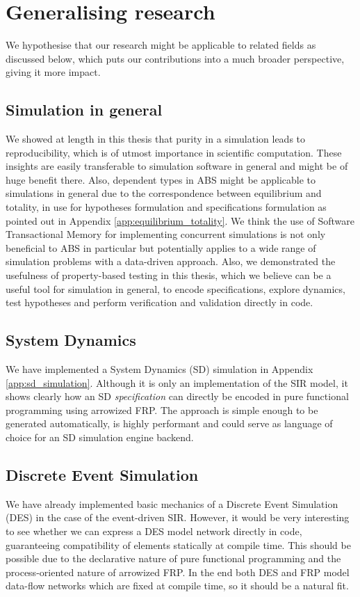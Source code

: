 \section{Generalising research}
We hypothesise that our research might be applicable to related fields as discussed below, which puts our contributions into a much broader perspective, giving it more impact.

\subsection{Simulation in general}
We showed at length in this thesis that purity in a simulation leads to reproducibility, which is of utmost importance in scientific computation. These insights are easily transferable to simulation software in general and might be of huge benefit there. Also, dependent types in ABS might be applicable to simulations in general due to the correspondence between equilibrium and totality, in use for hypotheses formulation and specifications formulation as pointed out in Appendix \ref{app:equilibrium_totality}.  We think the use of Software Transactional Memory for implementing concurrent simulations is not only beneficial to ABS in particular but potentially applies to a wide range of simulation problems with a data-driven approach. Also, we demonstrated the usefulness of property-based testing in this thesis, which we believe can be a useful tool for simulation in general, to encode specifications, explore dynamics, test hypotheses and perform verification and validation directly in code.

\subsection{System Dynamics}
We have implemented a System Dynamics (SD) simulation in Appendix \ref{app:sd_simulation}. Although it is only an implementation of the SIR model, it shows clearly how an SD \textit{specification} can directly be encoded in pure functional programming using arrowized FRP. The approach is simple enough to be generated automatically, is highly performant and could serve as language of choice for an SD simulation engine backend.

\subsection{Discrete Event Simulation}
We have already implemented basic mechanics of a Discrete Event Simulation (DES) in the case of the event-driven SIR. However, it would be very interesting to see whether we can express a DES model network directly in code, guaranteeing compatibility of elements statically at compile time. This should be possible due to the declarative nature of pure functional programming and the process-oriented nature of arrowized FRP. In the end both DES and FRP model data-flow networks which are fixed at compile time, so it should be a natural fit.

